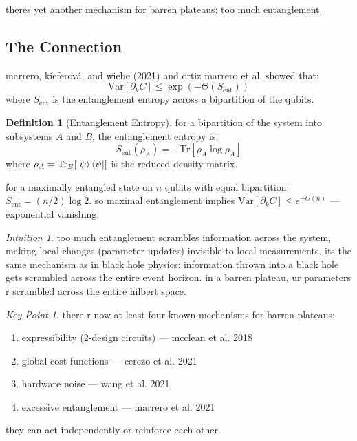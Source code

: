 \documentclass[11pt,a4paper]{article}
\theoremstyle{definition}
\newtheorem{definition}{Definition}[section]
\theoremstyle{remark}
\newtheorem*{intuition}{Intuition}
\newtheorem*{keypoint}{Key Point}
\begin{document}
theres yet another mechanism for barren plateaus: too much entanglement.

\subsection{The Connection}

marrero, kieferov\'a, and wiebe (2021) and ortiz marrero et al. showed that:
\begin{equation}
    \text{Var}[\partial_k C] \leq \exp\left(-\Theta(S_{\text{ent}})\right)
\end{equation}
where $S_{\text{ent}}$ is the entanglement entropy across a bipartition of the qubits.

\begin{definition}[Entanglement Entropy]
for a bipartition of the system into subsystems $A$ and $B$, the entanglement entropy is:
\begin{equation}
    S_{\text{ent}}(\rho_A) = -\text{Tr}[\rho_A \log \rho_A]
\end{equation}
where $\rho_A = \text{Tr}_B[\ket{\psi}\bra{\psi}]$ is the reduced density matrix.

for a maximally entangled state on $n$ qubits with equal bipartition: $S_{\text{ent}} = (n/2) \log 2$. so maximal entanglement implies $\text{Var}[\partial_k C] \leq e^{-\Theta(n)}$ --- exponential vanishing.
\end{definition}

\begin{intuition}
too much entanglement scrambles information across the system, making local changes (parameter updates) invisible to local measurements. its the same mechanism as in black hole physics: information thrown into a black hole gets scrambled across the entire event horizon. in a barren plateau, ur parameters r scrambled across the entire hilbert space.
\end{intuition}

\begin{keypoint}
there r now at least four known mechanisms for barren plateaus:
\begin{enumerate}[label=(\roman*)]
    \item expressibility (2-design circuits) --- mcclean et al. 2018
    \item global cost functions --- cerezo et al. 2021
    \item hardware noise --- wang et al. 2021
    \item excessive entanglement --- marrero et al. 2021
\end{enumerate}
they can act independently or reinforce each other.
\end{keypoint}
\end{document}
